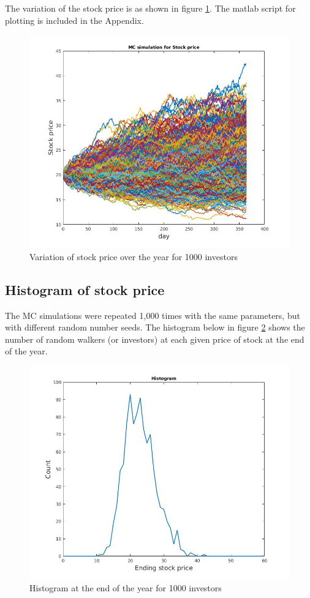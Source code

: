 \documentclass[11pt, oneside]{article}   	%
\begin{document}
The variation of the stock price is as shown in figure \ref{stock}. The matlab script for plotting is included in the Appendix.
	\begin{figure}[!htbp] \label{stock}
	\centering
	\includegraphics[scale=0.35]{stockPricePlot.jpg}
	\caption{Variation of stock price over the year for 1000 investors}
	\end{figure}

\subsection{\vspace{-2ex} Histogram of stock price}
The MC simulations were repeated 1,000 times with the same parameters, but with different random number seeds. The histogram below in figure \ref{hist} shows the number of random walkers (or investors) at each given price of stock at the end of the year.
	\begin{figure}[!htbp] \label{hist}
	\centering
	\includegraphics[scale=0.35]{stockHistogram.jpg}
	\caption{Histogram at the end of the year for 1000 investors}
	\end{figure}
\end{document}
